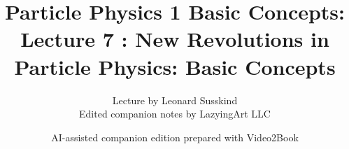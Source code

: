 \documentclass[11pt,oneside]{book}
\begin{document}
\frontmatter
\title{Particle Physics 1 Basic Concepts: Lecture 7 : New Revolutions in Particle Physics: Basic Concepts}
\author{Lecture by Leonard Susskind\\Edited companion notes by LazyingArt LLC}
\date{AI-assisted companion edition prepared with Video2Book}
\maketitle
\clearpage
\mainmatter

\end{document}
